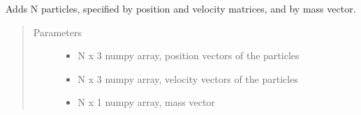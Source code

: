 \documentclass[letterpaper,10pt,english]{sphinxmanual}
\begin{document}
\begin{itemize}
\begin{fulllineitems}
\begin{fulllineitems}
\begin{quote}
\begin{description}
\begin{itemize}
\end{itemize}

\end{description}\end{quote}

\end{fulllineitems}


\begin{fulllineitems}
\label{\detokenize{space:nbody.simulator.space.Space.add_particles}}
\sphinxAtStartPar
Adds N particles, specified by position and velocity matrices, and by mass vector.
\begin{quote}\begin{description}
\item[{Parameters}] \leavevmode\begin{itemize}
\item {} 
\sphinxAtStartPar
{} \textendash{} N x 3 numpy array, position vectors of the particles

\item {} 
\sphinxAtStartPar
{} \textendash{} N x 3 numpy array, velocity vectors of the particles

\item {} 
\sphinxAtStartPar
{} \textendash{} N x 1 numpy array, mass vector

\end{itemize}

\end{description}\end{quote}

\end{fulllineitems}



\end{fulllineitems}
\end{itemize}
\end{document}
